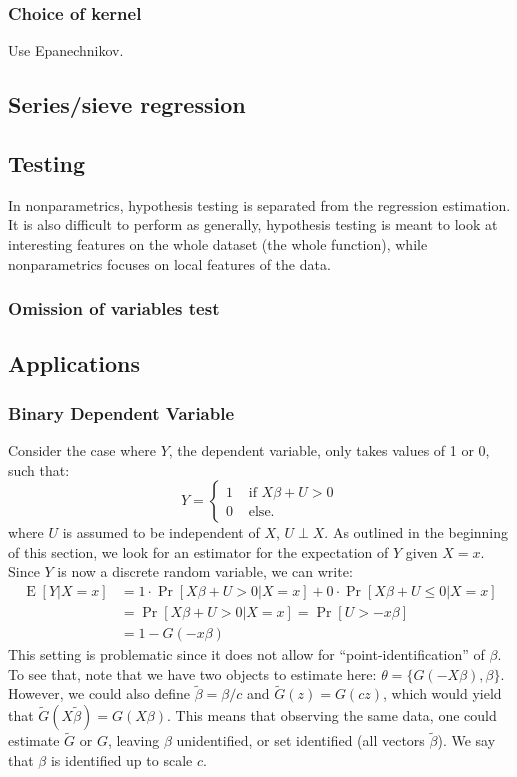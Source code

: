 \documentclass[12pt]{report}
\newcommand{\E}[1]{\operatorname{E}\left[#1\right]}
\newcommand{\Prob}[1]{\operatorname{Pr}\left[#1\right]}
\begin{document}
\subsubsection{Choice of kernel}

Use Epanechnikov.

\subsection{Series/sieve regression}



\subsection{Testing}

In nonparametrics, hypothesis testing is separated from the regression estimation. It is also difficult to perform as generally, hypothesis testing is meant to look at interesting features on the whole dataset (the whole function), while nonparametrics focuses on local features of the data.

\subsubsection{Omission of variables test}

\subsection{Applications}

\subsubsection{Binary Dependent Variable}

Consider the case where $Y$, the dependent variable, only takes values of 1 or 0, such that: $$Y = \begin{cases}
1 & \text{ if } X\beta + U > 0 \\
0 & \text{ else.}
\end{cases}
$$ where $U$ is assumed to be independent of $X$, $U\perp X$.
As outlined in the beginning of this section, we look for an estimator for the expectation of $Y$ given $X = x$. Since $Y$ is now a discrete random variable, we can write: \begin{align*}
\E{Y\vert X = x} & = 1 \cdot \Prob{X\beta + U > 0\vert X = x} + 0 \cdot \Prob{X\beta + U \leq 0\vert X = x} \\
& = \Prob{X\beta + U > 0 \vert X = x} = \Prob{U > -x\beta}\\
& = 1 - G(-x\beta)
\end{align*}
This setting is problematic since it does not allow for ``point-identification'' of $\beta$. To see that, note that we have two objects to estimate here: $\theta = \{G(-X\beta), \beta\}$. However, we could also define $\tilde\beta = \beta/c$ and $\tilde G(z) = G(cz)$, which would yield that $\tilde G(X\tilde\beta) = G(X\beta)$. This means that observing the same data, one could estimate $\tilde G$ or $G$, leaving $\beta$ unidentified, or set identified (all vectors $\tilde\beta$). We say that $\beta$ is identified up to scale $c$.
\end{document}

